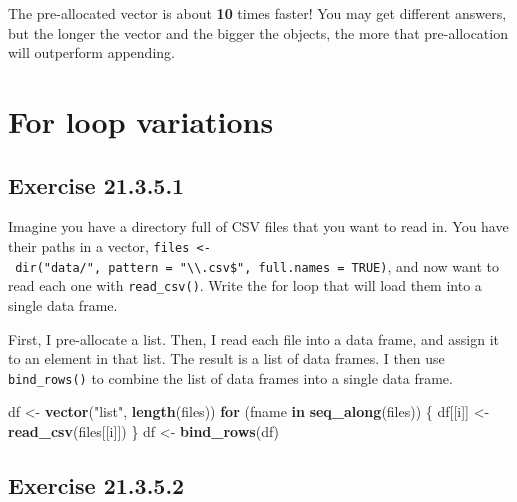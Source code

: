 \documentclass[]{book}
\newenvironment{Shaded}{\begin{snugshade}}{\end{snugshade}}
\newcommand{\ControlFlowTok}[1]{\textcolor[rgb]{0.13,0.29,0.53}{\textbf{#1}}}
\newcommand{\KeywordTok}[1]{\textcolor[rgb]{0.13,0.29,0.53}{\textbf{#1}}}
\newcommand{\NormalTok}[1]{#1}
\newcommand{\StringTok}[1]{\textcolor[rgb]{0.31,0.60,0.02}{#1}}
\theoremstyle{plain}
\theoremstyle{remark}
\begin{document}
The pre-allocated vector is about \textbf{10} times faster! You may get
different answers, but the longer the vector and the bigger the objects,
the more that pre-allocation will outperform appending.

\hypertarget{for-loop-variations}{%
\section{For loop variations}\label{for-loop-variations}}

\hypertarget{exercise-21.3.5.1}{%
\subsection*{\texorpdfstring{Exercise
{21.3.5.1}}{Exercise 21.3.5.1}}\label{exercise-21.3.5.1}}

Imagine you have a directory full of CSV files that you want to read in.
You have their paths in a vector,
\texttt{files\ \textless{}-\ dir("data/",\ pattern\ =\ "\textbackslash{}\textbackslash{}.csv\$",\ full.names\ =\ TRUE)},
and now want to read each one with \texttt{read\_csv()}. Write the for
loop that will load them into a single data frame.

First, I pre-allocate a list. Then, I read each file into a data frame,
and assign it to an element in that list. The result is a list of data
frames. I then use \texttt{bind\_rows()} to combine the list of data
frames into a single data frame.

\begin{Shaded}
\begin{Highlighting}[]
\NormalTok{df <-}\StringTok{ }\KeywordTok{vector}\NormalTok{(}\StringTok{"list"}\NormalTok{, }\KeywordTok{length}\NormalTok{(files))}
\ControlFlowTok{for}\NormalTok{ (fname }\ControlFlowTok{in} \KeywordTok{seq_along}\NormalTok{(files)) \{}
\NormalTok{  df[[i]] <-}\StringTok{ }\KeywordTok{read_csv}\NormalTok{(files[[i]])}
\NormalTok{\}}
\NormalTok{df <-}\StringTok{ }\KeywordTok{bind_rows}\NormalTok{(df)}
\end{Highlighting}
\end{Shaded}

\hypertarget{exercise-21.3.5.2}{%
\subsection*{\texorpdfstring{Exercise
{21.3.5.2}}{Exercise 21.3.5.2}}\label{exercise-21.3.5.2}}
\end{document}
